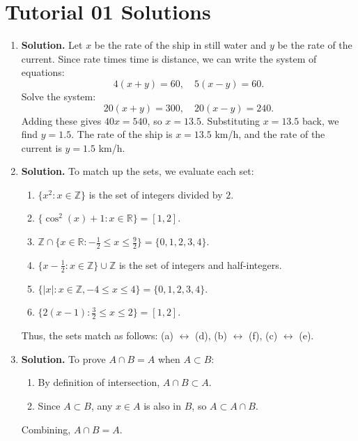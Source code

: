 \documentclass[12pt]{article}
\begin{document}
\section*{Tutorial 01 Solutions}

\begin{enumerate}
    \item \textbf{Solution.} Let $x$ be the rate of the ship in still water and $y$ be the rate of the current. 
    Since rate times time is distance, we can write the system of equations:
    \[
    4(x + y) = 60, \quad 5(x - y) = 60.
    \]
    Solve the system:
    \[
    20(x + y) = 300, \quad 20(x - y) = 240.
    \]
    Adding these gives $40x = 540$, so $x = 13.5$. Substituting $x = 13.5$ back, we find $y = 1.5$. 
    The rate of the ship is $x = 13.5$ km/h, and the rate of the current is $y = 1.5$ km/h.

    \item \textbf{Solution.} 
    To match up the sets, we evaluate each set:
    \begin{enumerate}
        \item $\{x^2 : x \in \mathbb{Z}\}$ is the set of integers divided by $2$.
        \item $\{\cos^2(x) + 1 : x \in \mathbb{R}\} = [1, 2]$.
        \item $\mathbb{Z} \cap \{x \in \mathbb{R} : -\frac{1}{2} \leq x \leq \frac{9}{2}\} = \{0, 1, 2, 3, 4\}$.
        \item $\{x - \frac{1}{2} : x \in \mathbb{Z}\} \cup \mathbb{Z}$ is the set of integers and half-integers.
        \item $\{|x| : x \in \mathbb{Z}, -4 \leq x \leq 4\} = \{0, 1, 2, 3, 4\}$.
        \item $\{2(x - 1) : \frac{3}{2} \leq x \leq 2\} = [1, 2]$.
    \end{enumerate}
    Thus, the sets match as follows: 
    (a) $\leftrightarrow$ (d), (b) $\leftrightarrow$ (f), (c) $\leftrightarrow$ (e).

    \item \textbf{Solution.} To prove $A \cap B = A$ when $A \subset B$:
    \begin{enumerate}
        \item By definition of intersection, $A \cap B \subset A$.
        \item Since $A \subset B$, any $x \in A$ is also in $B$, so $A \subset A \cap B$.
    \end{enumerate}
    Combining, $A \cap B = A$.


\end{enumerate}
\end{document}
